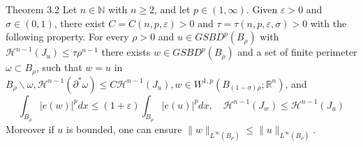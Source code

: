 \begin{theorem}
    Theorem 3.2 Let $n \in \mathbb{N}$ with $n \geq 2$, and let $p \in(1, \infty)$. Given $\varepsilon>0$ and $\sigma \in(0,1)$, there exist $C=C(n, p, \varepsilon)>0$ and $\tau=\tau(n, p, \varepsilon, \sigma)>0$ with the following property. For every $\rho>0$ and $u \in G S B D^p\left(B_\rho\right)$ with $\mathcal{H}^{n-1}\left(J_u\right) \leq \tau \rho^{n-1}$ there exists $w \in G S B D^p\left(B_\rho\right)$ and a set of finite perimeter $\omega \subset B_\rho$, such that $w=u$ in $B_\rho \backslash \omega, \mathcal{H}^{n-1}\left(\partial^* \omega\right) \leq C \mathcal{H}^{n-1}\left(J_u\right), w \in W^{1, p}\left(B_{(1-\sigma) \rho} ; \mathbb{R}^n\right)$, and
$$
\int_{B_\rho}|e(w)|^p d x \leq(1+\varepsilon) \int_{B_\rho}|e(u)|^p d x, \quad \mathcal{H}^{n-1}\left(J_w\right) \leq \mathcal{H}^{n-1}\left(J_u\right)
$$
Moreover if $u$ is bounded, one can ensure $\|w\|_{L^{\infty}\left(B_\rho\right)} \leq\|u\|_{L^{\infty}\left(B_\rho\right)}$.
\end{theorem}

